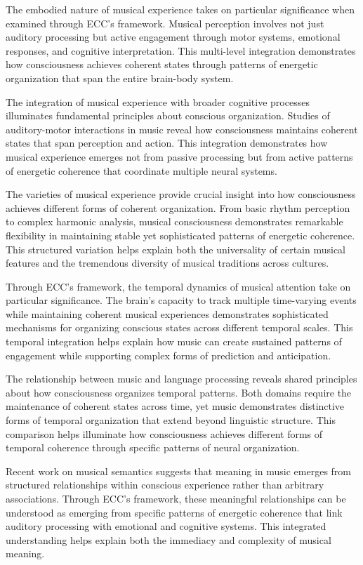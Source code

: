 The embodied nature of musical experience \cite{Reybrouck2005} takes on particular significance when examined through ECC's framework. Musical perception involves not just auditory processing but active engagement through motor systems, emotional responses, and cognitive interpretation. This multi-level integration demonstrates how consciousness achieves coherent states through patterns of energetic organization that span the entire brain-body system.

The integration of musical experience with broader cognitive processes illuminates fundamental principles about conscious organization. Studies of auditory-motor interactions in music \cite{Zatorre2007} reveal how consciousness maintains coherent states that span perception and action. This integration demonstrates how musical experience emerges not from passive processing but from active patterns of energetic coherence that coordinate multiple neural systems.

The varieties of musical experience \cite{Bharucha2006} provide crucial insight into how consciousness achieves different forms of coherent organization. From basic rhythm perception to complex harmonic analysis, musical consciousness demonstrates remarkable flexibility in maintaining stable yet sophisticated patterns of energetic coherence. This structured variation helps explain both the universality of certain musical features and the tremendous diversity of musical traditions across cultures.

Through ECC's framework, the temporal dynamics of musical attention \cite{Large1999} take on particular significance. The brain's capacity to track multiple time-varying events while maintaining coherent musical experiences demonstrates sophisticated mechanisms for organizing conscious states across different temporal scales. This temporal integration helps explain how music can create sustained patterns of engagement while supporting complex forms of prediction and anticipation.

The relationship between music and language processing \cite{Patel2010} reveals shared principles about how consciousness organizes temporal patterns. Both domains require the maintenance of coherent states across time, yet music demonstrates distinctive forms of temporal organization that extend beyond linguistic structure. This comparison helps illuminate how consciousness achieves different forms of temporal coherence through specific patterns of neural organization.

Recent work on musical semantics \cite{Reybrouck2005} suggests that meaning in music emerges from structured relationships within conscious experience rather than arbitrary associations. Through ECC's framework, these meaningful relationships can be understood as emerging from specific patterns of energetic coherence that link auditory processing with emotional and cognitive systems. This integrated understanding helps explain both the immediacy and complexity of musical meaning.

